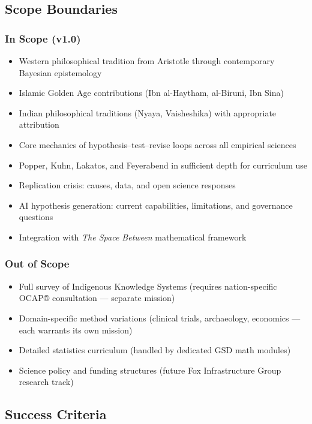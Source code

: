 \documentclass[11pt,letterpaper]{article}
\begin{document}
\subsection{Scope Boundaries}

\subsubsection{In Scope (v1.0)}

\begin{itemize}[leftmargin=1.5em]
  \item Western philosophical tradition from Aristotle through contemporary Bayesian epistemology
  \item Islamic Golden Age contributions (Ibn al-Haytham, al-Biruni, Ibn Sina)
  \item Indian philosophical traditions (Nyaya, Vaisheshika) with appropriate attribution
  \item Core mechanics of hypothesis--test--revise loops across all empirical sciences
  \item Popper, Kuhn, Lakatos, and Feyerabend in sufficient depth for curriculum use
  \item Replication crisis: causes, data, and open science responses
  \item AI hypothesis generation: current capabilities, limitations, and governance questions
  \item Integration with \emph{The Space Between} mathematical framework
\end{itemize}

\subsubsection{Out of Scope}

\begin{itemize}[leftmargin=1.5em]
  \item Full survey of Indigenous Knowledge Systems (requires nation-specific OCAP® consultation --- separate mission)
  \item Domain-specific method variations (clinical trials, archaeology, economics --- each warrants its own mission)
  \item Detailed statistics curriculum (handled by dedicated GSD math modules)
  \item Science policy and funding structures (future Fox Infrastructure Group research track)
\end{itemize}

\subsection{Success Criteria}
\end{document}
